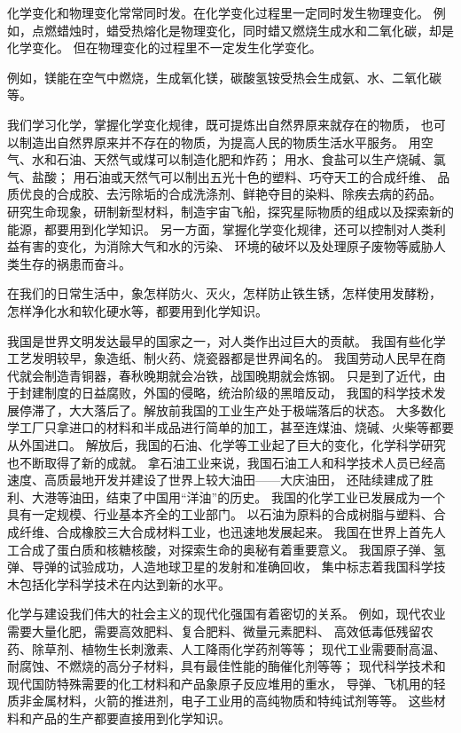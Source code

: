 化学变化和物理变化常常同时发。在化学变化过程里一定同时发生物理变化。
例如，点燃蜡烛时，蜡受热熔化是物理变化，同时蜡又燃烧生成水和二氧化碳，却是化学变化。
但在物理变化的过程里不一定发生化学变化。

例如，镁能在空气中燃烧，生成氧化镁，碳酸氢铵受热会生成氨、水、二氧化碳等。

我们学习化学，掌握化学变化规律，既可提炼出自然界原来就存在的物质，
也可以制造出自然界原来并不存在的物质，为提高人民的物质生活水平服务。
用空气、水和石油、天然气或煤可以制造化肥和炸药；
用水、食盐可以生产烧碱、氯气、盐酸；
用石油或天然气可以制出五光十色的塑料、巧夺天工的合成纤维、
品质优良的合成胶、去污除垢的合成洗涤剂、鲜艳夺目的染料、除疾去病的药品。
研究生命现象，研制新型材料，制造宇宙飞船，探究星际物质的组成以及探索新的能源，都要用到化学知识。
另一方面，掌握化学变化规律，还可以控制对人类利益有害的变化，为消除大气和水的污染、
环境的破坏以及处理原子废物等威胁人类生存的祸患而奋斗。

在我们的日常生活中，象怎样防火、灭火，怎样防止铁生锈，怎样使用发酵粉，
怎样净化水和软化硬水等，都要用到化学知识。

我国是世界文明发达最早的国家之一，对人类作出过巨大的贡献。
我国有些化学工艺发明较早，象造纸、制火药、烧瓷器都是世界闻名的。
我国劳动人民早在商代就会制造青铜器，春秋晚期就会冶铁，战国晚期就会炼钢。
只是到了近代，由于封建制度的日益腐败，外国的侵略，统治阶级的黑暗反动，
我国的科学技术发展停滞了，大大落后了。解放前我国的工业生产处于极端落后的状态。
大多数化学工厂只拿进口的材料和半成品进行简单的加工，甚至连煤油、烧碱、火柴等都要从外国进口。
解放后，我国的石油、化学等工业起了巨大的变化，化学科学研究也不断取得了新的成就。
拿石油工业来说，我国石油工人和科学技术人员已经高速度、高质最地开发并建设了世界上较大油田——大庆油田，
还陆续建成了胜利、大港等油田，结束了中国用“洋油”的历史。
我国的化学工业已发展成为一个具有一定规模、行业基本齐全的工业部门。
以石油为原料的合成树脂与塑料、合成纤维、合成橡胶三大合成材料工业，也迅速地发展起来。
我国在世界上首先人工合成了蛋白质和核糖核酸\footnotemark，对探索生命的奥秘有着重要意义。
我国原子弹、氢弹、导弹的试验成功，人造地球卫星的发射和准确回收，
集中标志着我国科学技木包括化学科学技术在内达到新的水平。

化学与建设我们伟大的社会主义的现代化强国有着密切的关系。
例如，现代农业需要大量化肥，需要高效肥料、复合肥料、微量元素肥料、
高效低毒低残留农药、除草剂、植物生长刺激素、人工降雨化学药剂等等；
现代工业需要耐高温、耐腐蚀、不燃烧的高分子材料，具有最佳性能的酶催化剂等等；
现代科学技术和现代国防特殊需要的化工材料和产品象原子反应堆用的重水，
导弹、飞机用的轻质非金属材料，火箭的推进剂，电子工业用的高纯物质和特纯试剂等等。
这些材料和产品的生产都要直接用到化学知识。


